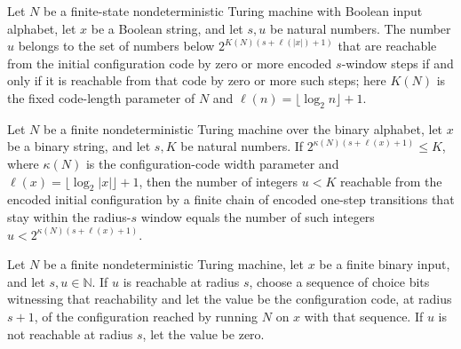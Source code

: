 \begin{lemma}
\label{Complexity.ExpBFS.mem_rset}
\leanok
{}
Let $N$ be a finite-state nondeterministic Turing machine with Boolean input alphabet,
let $x$ be a Boolean string, and let $s,u$ be natural numbers. The number $u$ belongs to
the set of numbers below $2^{K(N)(s+\ell(|x|)+1)}$ that are reachable from the initial
configuration code by zero or more encoded $s$-window steps if and only if it is
reachable from that code by zero or more such steps; here $K(N)$ is the fixed
code-length parameter of $N$ and $\ell(n)=\lfloor\log_2 n\rfloor+1$.
\end{lemma}

\begin{lemma}
\label{Complexity.ExpBFS.card_filter_rcode}
\leanok
{}
Let $N$ be a finite nondeterministic Turing machine over the binary alphabet, let $x$ be
a binary string, and let $s,K$ be natural numbers. If $2^{\kappa(N)(s+\ell(x)+1)}\le K$,
where $\kappa(N)$ is the configuration-code width parameter and $\ell(x)=\lfloor\log_2
|x|\rfloor+1$, then the number of integers $u<K$ reachable from the encoded initial
configuration by a finite chain of encoded one-step transitions that stay within the
radius-$s$ window equals the number of such integers $u<2^{\kappa(N)(s+\ell(x)+1)}$.
\end{lemma}

\begin{definition}
\label{Complexity.ExpBFS.recode}
\leanok
{}
Let $N$ be a finite nondeterministic Turing machine, let $x$ be a finite binary input,
and let $s,u\in\mathbb{N}$. If $u$ is reachable at radius $s$, choose a sequence of
choice bits witnessing that reachability and let the value be the configuration code, at
radius $s+1$, of the configuration reached by running $N$ on $x$ with that sequence. If
$u$ is not reachable at radius $s$, let the value be zero.
\end{definition}

